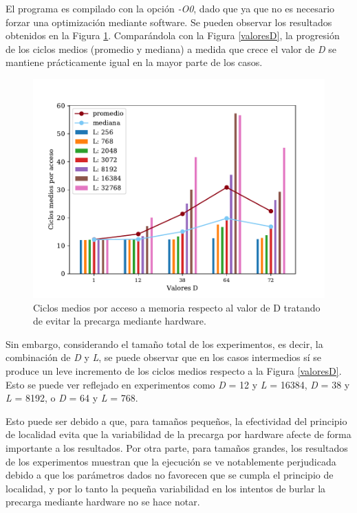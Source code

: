 \documentclass[conference]{IEEEtran}
\begin{document}
El programa es compilado con la opción \textit{-O0}, dado que ya que no es necesario forzar una optimización mediante software. Se pueden observar los resultados obtenidos en la Figura \ref{precargaHardware}. Comparándola con la Figura \ref{valoresD}, la progresión de los ciclos medios (promedio y mediana) a medida que crece el valor de \textit{D} se mantiene prácticamente igual en la mayor parte de los casos.

\begin{figure}[htbp]
\centerline{\includegraphics[scale=0.64]{QuemarHardware.pdf}}
\caption{Ciclos medios por acceso a memoria respecto al valor de D tratando de evitar la precarga mediante hardware.}
\label{precargaHardware}
\end{figure}

Sin embargo, considerando el tamaño total de los experimentos, es decir, la combinación de \textit{D} y \textit{L}, se puede observar que en los casos intermedios sí se produce un leve incremento de los ciclos medios respecto a la Figura \ref{valoresD}. Esto se puede ver reflejado en experimentos como \textit{D} = 12 y \textit{L} = 16384, \textit{D} = 38 y \textit{L} = 8192, o \textit{D} = 64 y \textit{L} = 768.

Esto puede ser debido a que, para tamaños pequeños, la efectividad del principio de localidad evita que la variabilidad de la precarga por hardware afecte de forma importante a los resultados. Por otra parte, para tamaños grandes, los resultados de los experimentos muestran que la ejecución se ve notablemente perjudicada debido a que los parámetros dados no favorecen que se cumpla el principio de localidad, y por lo tanto la pequeña variabilidad en los intentos de burlar la precarga mediante hardware no se hace notar.
\end{document}

